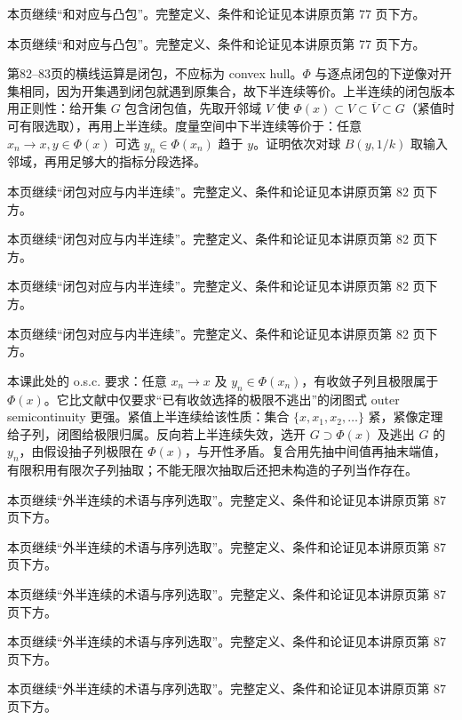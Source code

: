 本页继续“和对应与凸包”。完整定义、条件和论证见本讲原页第 77 页下方。

本页继续“和对应与凸包”。完整定义、条件和论证见本讲原页第 77 页下方。

第82--83页的横线运算是闭包，不应标为 convex hull。$\Phi$ 与逐点闭包的下逆像对开集相同，因为开集遇到闭包就遇到原集合，故下半连续等价。上半连续的闭包版本用正则性：给开集 $G$ 包含闭包值，先取开邻域 $V$ 使 $\Phi(x)\subset V\subset\overline V\subset G$（紧值时可有限选取），再用上半连续。度量空间中下半连续等价于：任意 $x_n\to x,y\in\Phi(x)$ 可选 $y_n\in\Phi(x_n)$ 趋于 $y$。证明依次对球 $B(y,1/k)$ 取输入邻域，再用足够大的指标分段选择。

本页继续“闭包对应与内半连续”。完整定义、条件和论证见本讲原页第 82 页下方。

本页继续“闭包对应与内半连续”。完整定义、条件和论证见本讲原页第 82 页下方。

本页继续“闭包对应与内半连续”。完整定义、条件和论证见本讲原页第 82 页下方。

本页继续“闭包对应与内半连续”。完整定义、条件和论证见本讲原页第 82 页下方。

本课此处的 o.s.c. 要求：任意 $x_n\to x$ 及 $y_n\in\Phi(x_n)$，有收敛子列且极限属于 $\Phi(x)$。它比文献中仅要求“已有收敛选择的极限不逃出”的闭图式 outer semicontinuity 更强。紧值上半连续给该性质：集合 $\{x,x_1,x_2,\ldots\}$ 紧，紧像定理给子列，闭图给极限归属。反向若上半连续失效，选开 $G\supset\Phi(x)$ 及逃出 $G$ 的 $y_n$，由假设抽子列极限在 $\Phi(x)$，与开性矛盾。复合用先抽中间值再抽末端值，有限积用有限次子列抽取；不能无限次抽取后还把未构造的子列当作存在。

本页继续“外半连续的术语与序列选取”。完整定义、条件和论证见本讲原页第 87 页下方。

本页继续“外半连续的术语与序列选取”。完整定义、条件和论证见本讲原页第 87 页下方。

本页继续“外半连续的术语与序列选取”。完整定义、条件和论证见本讲原页第 87 页下方。

本页继续“外半连续的术语与序列选取”。完整定义、条件和论证见本讲原页第 87 页下方。

本页继续“外半连续的术语与序列选取”。完整定义、条件和论证见本讲原页第 87 页下方。

